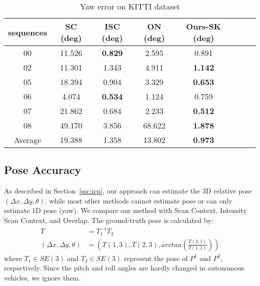 \documentclass[letterpaper, 10 pt, conference]{ieeeconf}  %
\begin{document}
    \begin{table}[t]\footnotesize
        \caption{\centering Yaw error on KITTI dataset}\vspace{-3mm}
        \label{table:yaw}
        \begin{center}
        \begin{threeparttable}
            {
        \begin{tabular}{c c c c c c c c}
        \hline
        sequences & SC (deg) & ISC (deg) & ON (deg) & Ours-SK (deg) \\ 
        \hline
        00 & 11.526&\textbf{0.829}&2.595&0.891\\
        02 &11.301&1.343&4.911&\textbf{1.142}\\
        05 &18.394&0.904&3.329&\textbf{0.653}\\
        06 &4.074&\textbf{0.534}&1.124&0.759\\
        07 &21.862&0.684&2.233&\textbf{0.512}\\
        08 &49.170&3.856&68.622&\textbf{1.878}\\
        Average &19.388&1.358&13.802&\textbf{0.973}\\
        \hline
        \end{tabular}
        }
        \end{threeparttable}
        \end{center}
        \end{table}
     
\subsection{Pose Accuracy}
As described in Section~\ref{ssc:icp}, our approach can estimate the 3D relative pose \( (\Delta x, \Delta y, \theta)\), while most other methods cannot estimate pose or can only estimate 1D pose (yaw). We compare our method with Scan Context, Intensity Scan Context, and Overlap. The ground-truth pose is calculated by:
\begin{equation}
    \begin{aligned}
    T&=T_1^{-1}T_2\\
    (\Delta x,\Delta y,\theta)&=(T(1,3),T(2,3),arctan(\frac{T(2,1)}{T(1,1)}))
    \end{aligned}
\end{equation}
where \(T_1\in SE(3)\) and \(T_2\in SE(3)\) represent the pose of \(P^1\) and \(P^2\), respectively. Since the pitch and roll angles are hardly changed in autonomous vehicles, we ignore them.
\end{document}
